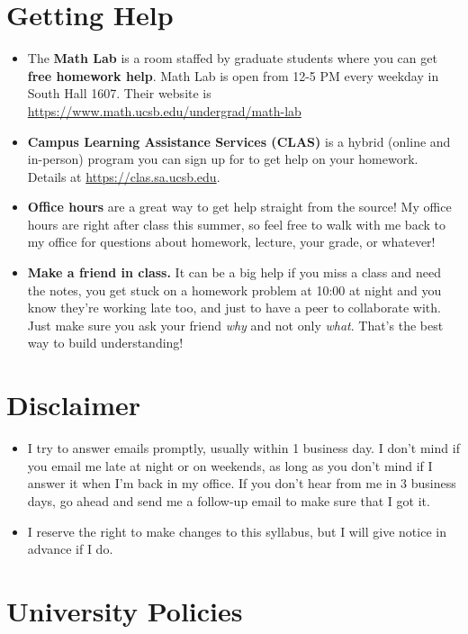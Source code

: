 \documentclass[11pt,letterpaper]{article}
\begin{document}
\section*{Getting Help}
\begin{itemize}[nosep]
\item The \textbf{Math Lab} is a room staffed by graduate students where you can get \textbf{free homework help}. Math Lab is open from 12-5 PM every weekday in South Hall 1607. Their website is \\
\href{https://www.math.ucsb.edu/undergrad/math-lab}{https://www.math.ucsb.edu/undergrad/math-lab}
\item \textbf{Campus Learning Assistance Services (CLAS)} is a hybrid (online and in-person) program you can sign up for to get help on your homework. Details at \href{https://clas.sa.ucsb.edu}{https://clas.sa.ucsb.edu}.
\item \textbf{Office hours} are a great way to get help straight from the source! My office hours are right after class this summer, so feel free to walk with me back to my office for questions about homework, lecture, your grade, or whatever!
\item \textbf{Make a friend in class.} It can be a big help if you miss a class and need the notes, you get stuck on a homework problem at 10:00 at night and you know they're working late too, and just to have a peer to collaborate with. Just make sure you ask your friend \textit{why} and not only \textit{what}. That's the best way to build understanding!
\end{itemize}

\section*{Disclaimer}
\begin{itemize}[nosep]
\item I try to answer emails promptly, usually within 1 business day. I don't mind if you email me late at night or on weekends, as long as you don't mind if I answer it when I'm back in my office. If you don't hear from me in 3 business days, go ahead and send me a follow-up email to make sure that I got it.
\item I reserve the right to make changes to this syllabus, but I will give notice in advance if I do.
\end{itemize}

\section*{University Policies}
\end{document}
